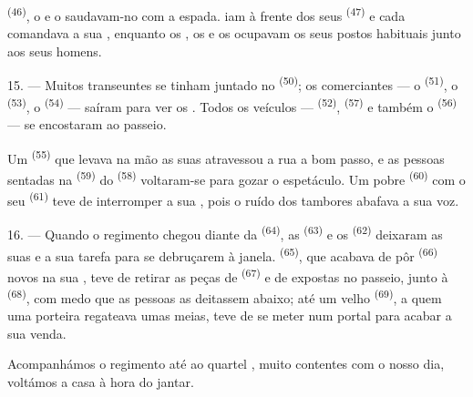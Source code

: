  \textsuperscript{(46)}, o  e o
 saudavam-no com a espada.  iam à
frente dos seus  \textsuperscript{(47)} e cada 
comandava a sua , enquanto os , os
 e os  ocupavam os seus postos habituais
junto aos seus homens.

15. --- Muitos transeuntes se tinham juntado no 
\textsuperscript{(50)}; os comerciantes --- o 
\textsuperscript{(51)}, o  \textsuperscript{(53)}, o 
\textsuperscript{(54)} --- saíram para ver os . Todos os veículos
---  \textsuperscript{(52)},  \textsuperscript{(57)} e também o 
\textsuperscript{(56)} --- se encostaram ao passeio.

\VUsaut{3.0mm}

Um  \textsuperscript{(55)} que levava na mão as suas
 atravessou a rua a bom passo, e as pessoas
sentadas na  \textsuperscript{(59)} do 
\textsuperscript{(58)} voltaram-se para gozar o espetáculo. Um pobre
 \textsuperscript{(60)} com o seu 
\textsuperscript{(61)} teve de interromper a sua , pois o ruído dos
tambores abafava a sua voz.

16. --- Quando o regimento chegou diante da 
\textsuperscript{(64)}, as  \textsuperscript{(63)} e os
 \textsuperscript{(62)} deixaram as suas  e a sua tarefa para se debruçarem à janela. 
\textsuperscript{(65)}, que acabava de pôr  \textsuperscript{(66)} novos na
sua , teve de retirar as peças de 
\textsuperscript{(67)} e de  expostas no passeio, junto à  \textsuperscript{(68)}, com medo que as pessoas as deitassem abaixo;
até um velho  \textsuperscript{(69)}, a quem uma porteira
regateava umas meias, teve de se meter num portal para acabar a sua
venda.

Acompanhámos o regimento até ao quartel , muito contentes com o
nosso dia, voltámos a casa à hora do jantar.

